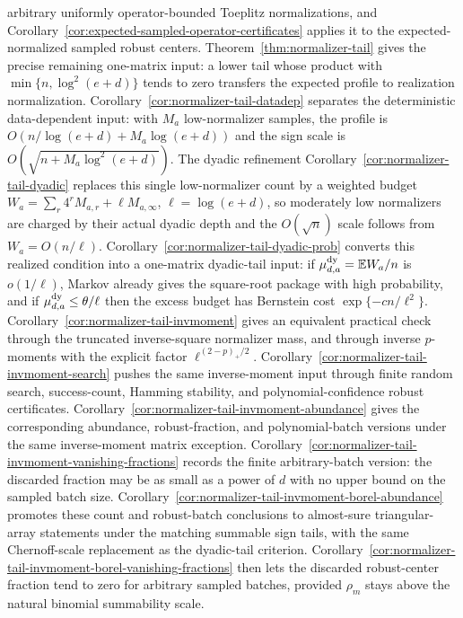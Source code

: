 \documentclass[11pt]{amsart}
\numberwithin{equation}{section}
\theoremstyle{definition}
\theoremstyle{remark}
\newcommand{\Exp}{\mathbb E}
\begin{document}
arbitrary uniformly operator-bounded Toeplitz normalizations, and
Corollary~\ref{cor:expected-sampled-operator-certificates} applies it to the
expected-normalized sampled robust centers.
Theorem~\ref{thm:normalizer-tail} gives the precise remaining one-matrix input:
a lower tail whose product with \(\min\{n,\log^2(e+d)\}\) tends to zero
transfers the expected profile to realization normalization.
Corollary~\ref{cor:normalizer-tail-datadep} separates the deterministic
data-dependent input: with \(M_a\) low-normalizer samples, the profile is
\(O(n/\log(e+d)+M_a\log(e+d))\) and the sign scale is
\(O(\sqrt{n+M_a\log^2(e+d)})\).  The dyadic refinement
Corollary~\ref{cor:normalizer-tail-dyadic} replaces this single low-normalizer
count by a weighted budget \(W_a=\sum_r4^rM_{a,r}+\ell M_{a,\infty}\),
\(\ell=\log(e+d)\), so moderately low normalizers are charged by their actual
dyadic depth and the \(O(\sqrt n)\) scale follows from \(W_a=O(n/\ell)\).
Corollary~\ref{cor:normalizer-tail-dyadic-prob} converts this realized condition
into a one-matrix dyadic-tail input: if
\(\mu_{d,a}^{\rm dy}=\Exp W_a/n\) is \(o(1/\ell)\), Markov already gives the
square-root package with high probability, and if
\(\mu_{d,a}^{\rm dy}\le\theta/\ell\) then the excess budget has
Bernstein cost \(\exp\{-c n/\ell^2\}\).
Corollary~\ref{cor:normalizer-tail-invmoment} gives an equivalent practical
check through the truncated inverse-square normalizer mass, and through inverse
\(p\)-moments with the explicit factor \(\ell^{(2-p)_+/2}\).
Corollary~\ref{cor:normalizer-tail-invmoment-search} pushes the same
inverse-moment input through finite random search, success-count, Hamming
stability, and polynomial-confidence robust certificates.
Corollary~\ref{cor:normalizer-tail-invmoment-abundance} gives the corresponding
abundance, robust-fraction, and polynomial-batch versions under the same
inverse-moment matrix exception.
Corollary~\ref{cor:normalizer-tail-invmoment-vanishing-fractions} records the
finite arbitrary-batch version: the discarded fraction may be as small as a
power of \(d\) with no upper bound on the sampled batch size.
Corollary~\ref{cor:normalizer-tail-invmoment-borel-abundance} promotes these
count and robust-batch conclusions to almost-sure triangular-array statements
under the matching summable sign tails, with the same Chernoff-scale replacement
as the dyadic-tail criterion.
Corollary~\ref{cor:normalizer-tail-invmoment-borel-vanishing-fractions} then
lets the discarded robust-center fraction tend to zero for arbitrary sampled
batches, provided \(\rho_m\) stays above the natural binomial summability scale.
\end{document}
